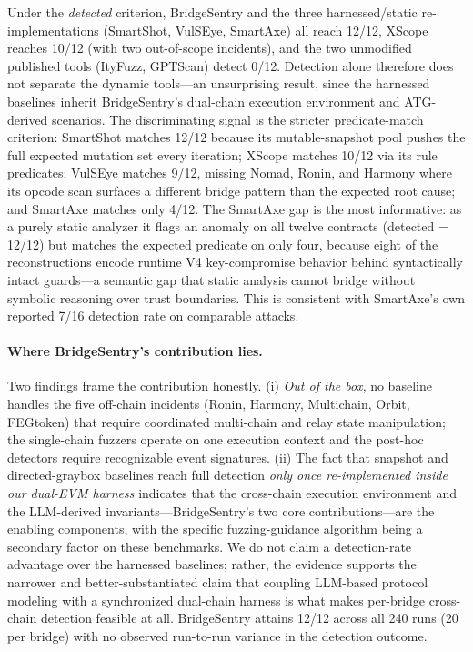 \documentclass[journal]{IEEEtran}
\begin{document}
Under the \emph{detected} criterion, BridgeSentry and the three harnessed/static re-implementations (SmartShot, VulSEye, SmartAxe) all reach 12/12, XScope reaches 10/12 (with two out-of-scope incidents), and the two unmodified published tools (ItyFuzz, GPTScan) detect 0/12. Detection alone therefore does not separate the dynamic tools---an unsurprising result, since the harnessed baselines inherit BridgeSentry's dual-chain execution environment and ATG-derived scenarios. The discriminating signal is the stricter predicate-match criterion: SmartShot matches 12/12 because its mutable-snapshot pool pushes the full expected mutation set every iteration; XScope matches 10/12 via its rule predicates; VulSEye matches 9/12, missing Nomad, Ronin, and Harmony where its opcode scan surfaces a different bridge pattern than the expected root cause; and SmartAxe matches only 4/12. The SmartAxe gap is the most informative: as a purely static analyzer it flags an anomaly on all twelve contracts (detected = 12/12) but matches the expected predicate on only four, because eight of the reconstructions encode runtime V4 key-compromise behavior behind syntactically intact guards---a semantic gap that static analysis cannot bridge without symbolic reasoning over trust boundaries. This is consistent with SmartAxe's own reported 7/16 detection rate on comparable attacks.

\paragraph{Where BridgeSentry's contribution lies.}
Two findings frame the contribution honestly. (i) \emph{Out of the box}, no baseline handles the five off-chain incidents (Ronin, Harmony, Multichain, Orbit, FEGtoken) that require coordinated multi-chain and relay state manipulation; the single-chain fuzzers operate on one execution context and the post-hoc detectors require recognizable event signatures. (ii) The fact that snapshot and directed-graybox baselines reach full detection \emph{only once re-implemented inside our dual-EVM harness} indicates that the cross-chain execution environment and the LLM-derived invariants---BridgeSentry's two core contributions---are the enabling components, with the specific fuzzing-guidance algorithm being a secondary factor on these benchmarks. We do not claim a detection-rate advantage over the harnessed baselines; rather, the evidence supports the narrower and better-substantiated claim that coupling LLM-based protocol modeling with a synchronized dual-chain harness is what makes per-bridge cross-chain detection feasible at all. BridgeSentry attains 12/12 across all 240 runs (20 per bridge) with no observed run-to-run variance in the detection outcome.
\end{document}
